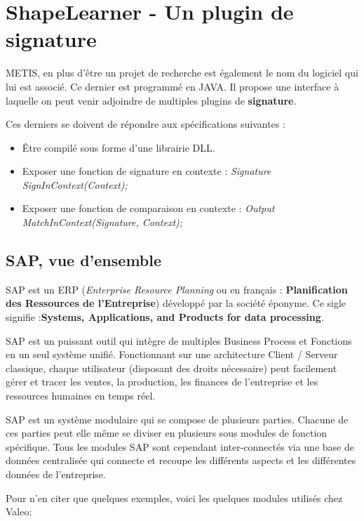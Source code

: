 \section{ShapeLearner - Un plugin de signature}

METIS, en plus d'être un projet de recherche est également le nom du logiciel qui lui est associé. Ce dernier est programmé en JAVA. Il propose une interface à laquelle on peut venir adjoindre de multiples plugins de \textbf{signature}.

Ces derniers se doivent de répondre aux spécifications suivantes :
\begin{itemize}
	\item Être compilé sous forme d'une librairie DLL.
	\item Exposer une fonction de signature en contexte : \textit{Signature SignInContext(Context);}
	\item Exposer une fonction de comparaison en contexte : \textit{Output MatchInContext(Signature, Context);}
\end{itemize}

\subsection{SAP, vue d'ensemble}

SAP est un ERP (\emph{Enterprise Resource Planning} ou en français :  \textbf{Planification des Ressources de l'Entreprise}) développé par la société éponyme. Ce sigle signifie :\textbf{Systems, Applications, and Products for data processing}.

SAP est un puissant outil qui intègre de multiples Business Process et Fonctions en un seul système unifié. Fonctionnant sur une architecture Client / Serveur classique, chaque utilisateur (disposant des droits nécessaire) peut facilement gérer et tracer les ventes, la production, les finances de l'entreprise et les ressources humaines en temps réel. 

SAP est un système modulaire qui se compose de plusieurs parties. Chacune de ces parties peut elle même se diviser en plusieurs sous modules de fonction spécifique.
Tous les modules SAP sont cependant inter-connectés via une base de données centralisée qui connecte et recoupe les différents aspects et les différentes données de l'entreprise.

Pour n'en citer que quelques exemples, voici les quelques modules utilisés chez Valeo:

